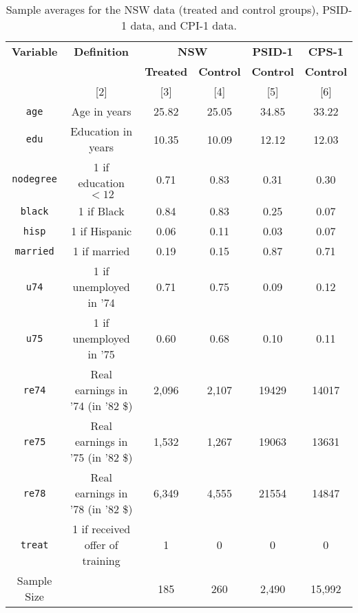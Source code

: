 \begin{table}[ht!]
    \label{tab:descriptive-stats}
    \centering
    \begin{tabular}{cccccc}
    \hline
    \textbf{Variable} & \textbf{Definition} & \multicolumn{2}{c}{\textbf{NSW}}    & \textbf{PSID-1}  & \textbf{CPS-1}   \\ \cline{3-6} 
    \textbf{}         & \textbf{}           & \textbf{Treated} & \textbf{Control} & \textbf{Control} & \textbf{Control} \\ 
    \hline
    [1] & [2] & [3] & [4] & [5] & [6] \\ \hline
    \texttt{age}      & Age in years                     & 25.82 & 25.05 & 34.85 & 33.22  \\
    \texttt{edu}      & Education in years               & 10.35 & 10.09 & 12.12 & 12.03  \\
    \texttt{nodegree} & 1 if education $<12$             & 0.71  & 0.83  & 0.31  & 0.30   \\
    \texttt{black}    & 1 if Black                       & 0.84  & 0.83  & 0.25  & 0.07   \\
    \texttt{hisp}     & 1 if Hispanic                    & 0.06  & 0.11  & 0.03  & 0.07   \\
    \texttt{married}  & 1 if married                     & 0.19  & 0.15  & 0.87  & 0.71   \\
    \texttt{u74}      & 1 if unemployed in '74           & 0.71  & 0.75  & 0.09  & 0.12   \\
    \texttt{u75}      & 1 if unemployed in '75           & 0.60  & 0.68  & 0.10  & 0.11   \\
    \texttt{re74}     & Real earnings in '74 (in '82 \$) & 2,096 & 2,107 & 19429 & 14017  \\
    \texttt{re75}     & Real earnings in '75 (in '82 \$) & 1,532 & 1,267 & 19063 & 13631  \\
    \hline
    \texttt{re78}     & Real earnings in '78 (in '82 \$) & 6,349 & 4,555 & 21554   & 14847       \\
    \texttt{treat}    & 1 if received offer of training  & 1     & 0     & 0      & 0       \\ \hline
    Sample Size                        &                                  & 185   & 260   & 2,490 & 15,992 \\ \hline
    \end{tabular}
    \caption{Sample averages for the NSW data (treated and control groups), PSID-1 data, and CPI-1 data.}
    \end{table}
